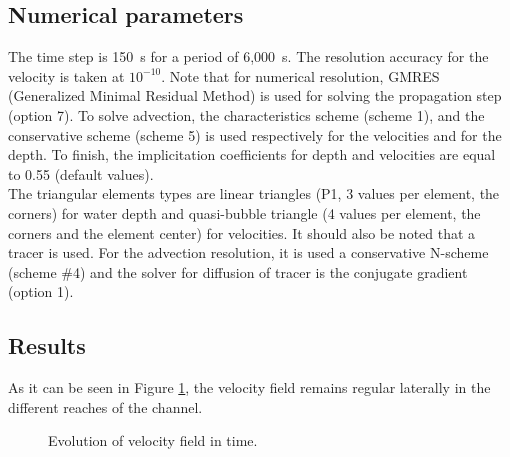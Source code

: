 \subsection{Numerical parameters}

The time step is 150~s for a period of 6,000~s.
The resolution accuracy for the velocity is taken at $10^{-10}$.
Note that for numerical resolution, GMRES (Generalized Minimal Residual Method)
is used for solving the propagation step (option 7). To solve advection,
the characteristics scheme (scheme 1), and the conservative scheme (scheme 5)
is used respectively for the velocities and for the depth. To finish,
the implicitation coefficients for depth and velocities are equal to 0.55
(default values).\\
The triangular elements types are linear triangles (P1, 3 values per element,
the corners) for water depth and quasi-bubble triangle (4 values per element,
the corners and the element center) for velocities.
It should also be noted that a tracer is used.
For the advection resolution, it is used a conservative N-scheme (scheme \#4)
and the solver for diffusion of tracer is the conjugate gradient (option 1).

\subsection{Results}

As it can be seen in Figure \ref{t2d:weirs:velocity},
the velocity field remains regular laterally in the different reaches of the channel.

\begin{figure}[!htbp]
\begin{minipage}[t]{0.50\textwidth}
 \centering
\end{minipage}
\begin{minipage}[t]{0.50\textwidth}
 \centering
\end{minipage}
\begin{minipage}[t]{0.50\textwidth}
 \centering
\end{minipage}
\begin{minipage}[t]{0.50\textwidth}
 \centering
\end{minipage}
 \caption{Evolution of velocity field in time.}
 \label{t2d:weirs:velocity}
\end{figure}

